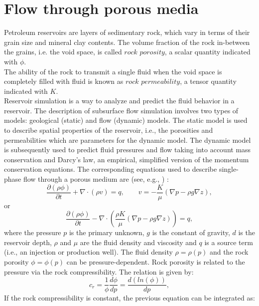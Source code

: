 \documentclass[review]{elsarticle}
\begin{document}
 \section{Flow through porous media}\label{fpm}
Petroleum reservoirs are layers of sedimentary rock, which vary in terms of their grain size and mineral clay contents. The volume fraction of the rock in-between the grains, i.e. the void space, is called $rock$
$porosity$, a scalar quantity indicated with $\phi$.\\
The ability of the rock to transmit a single fluid when the void space is completely filled with fluid
is known as $rock$ $permeability$, a tensor quantity indicated with ${K}$. \\
Reservoir simulation is a way to analyze and predict the fluid behavior in a reservoir. The description of subsurface flow simulation involves two types of models: geological (static) and flow (dynamic) models. The static model is used to describe spatial properties of the reservoir, i.e., the porosities and permeabilities which are parameters for the dynamic model. 
The dynamic model is subsequently used to predict fluid pressures and flow taking into account mass conservation and Darcy's law, an empirical, simplified version of the momentum conservation equations. The corresponding equations used to describe single-phase flow through a porous medium are (see, e.g., \cite{Aziz79,Chen06,Jansen13})  :
\begin{equation}\label{eq:ce}
\frac{\partial (\rho \phi)}{\partial t}+ \nabla \cdot ( \rho {v})=q, \qquad v=-\frac{K}{\mu}(\nabla p-\rho g\nabla z),
\end{equation}
or
\begin{equation}\label{eq:ce1}
\frac{\partial (\rho \phi)}{\partial t}- \nabla \cdot \left( \frac{\rho{K}}{\mu}(\nabla {p}-\rho g\nabla z)\right)=q,
\end{equation}
where the pressure $p$ is the primary unknown, $g$ is the constant of gravity, $d$ is the reservoir depth,
$\rho$ and $\mu$ are the fluid density and viscosity and $q$ is a source term (i.e., an injection or production well). The fluid density $\rho=\rho(p)$ and the rock porosity $\phi=\phi(p)$ can be pressure-dependent.
Rock porosity is related to the pressure via the rock compressibility. The relation is given by:
\begin{equation*}
 c_r=\frac{1}{\phi}\frac{d\phi}{dp}=\frac{d(ln(\phi))}{dp},
\end{equation*}
If the rock compressibility is constant, the previous equation can be integrated as:
\end{document}
